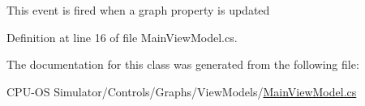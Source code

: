 This event is fired when a graph property is updated 



Definition at line 16 of file Main\+View\+Model.\+cs.



The documentation for this class was generated from the following file\+:\begin{DoxyCompactItemize}
\item 
C\+P\+U-\/\+O\+S Simulator/\+Controls/\+Graphs/\+View\+Models/\hyperlink{_main_view_model_8cs}{Main\+View\+Model.\+cs}\end{DoxyCompactItemize}
